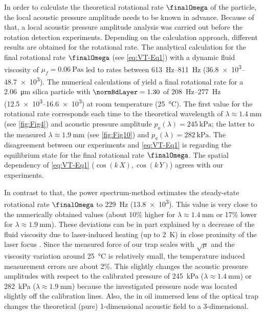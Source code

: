 In order to calculate the theoretical rotational rate $\finalOmega$ of the 
particle, the local acoustic pressure amplitude needs to be known in advance.  
Because of that, a local acoustic pressure amplitude analysis was carried out 
before the rotation detection experiments. Depending on the calculation 
approach, different results are obtained for the rotational rate. The analytical 
calculation for the final rotational rate $\finalOmega$ (see \cref{eq:VT-Eq1}) 
\cite{lamprecht2015, Busse, Rudnick, Wang} with a dynamic fluid viscosity of 
$\mu_{f} = \SI{0.06}{\pascal\second}$ led to rates between 
\SIrange{613}{811}{\hertz} (\SIrange{36.8e3}{48.7e3}{\rpm}). The numerical 
calculations of \citeauthor{hahn2016} \cite{hahn2016} yield a final rotational 
rate for a \SI{2.06}{\micro\meter} silica particle with $\normBdLayer=1.30$ of 
\SIrange{208}{277}{\hertz} (\SIrange{12.5e3}{16.6e3}{\rpm}) at room temperature 
(\SI{25}{\celsius}).  The first value for the rotational rate corresponds each 
time to the theoretical wavelength of $\lambda \approx \SI{1.4}{\mm}$ (see 
\cref{fig:Fig4}) and acoustic pressure amplitude $p_{a}\left(\lambda\right) = 
\SI{245}{\kilo\pascal} $; the latter to the measured $\lambda \approx 
\SI{1.9}{\mm}$ (see \cref{fig:Fig10}) and $p_{a}\left(\lambda\right) = 
\SI{282}{\kilo\pascal} $. The disagreement between our experiments and 
\cref{eq:VT-Eq1} is regarding the equilibrium state for the final rotational rate 
$\finalOmega$. The spatial dependency of \cref{eq:VT-Eq1} ($\cos\left(k\,X\right), 
\cos\left( k\,Y \right)$) agrees with our experiments.

In contrast to that, the power spectrum-method estimates the steady-state 
rotational rate $\finalOmega$ to \SI{229}{\hertz} (\SI{13.8e3}{\rpm}). This 
value is very close to the numerically obtained values (about 10$\%$ higher for 
$\lambda \approx \SI{1.4}{\mm}$ or 17$\%$ lower for $\lambda \approx 
\SI{1.9}{\mm}$).  These deviations can be in part explained by a decrease of 
the fluid viscosity due to laser-induced heating (up to \SI{2}{\kelvin}) in 
close proximity of the laser focus \cite{peterman2003}. Since the measured force 
of our trap scales with $\sqrt{\mu}$ and the viscosity variation around 
\SI{25}{\celsius} is relatively small, the temperature induced measurement 
errors are about 2\%.  This slightly changes the acoustic pressure amplitudes 
with respect to the calibrated pressure of \SI{245}{\kilo\pascal} ($\lambda 
\approx \SI{1.4}{\mm}$) or \SI{282}{\kilo\pascal} ($\lambda \approx 
\SI{1.9}{\mm}$) because the investigated pressure node was located slightly off 
the calibration lines.  Also, the in oil immersed lens of the optical trap 
changes the theoretical (pure) 1-dimensional acoustic field to a 3-dimensional.

